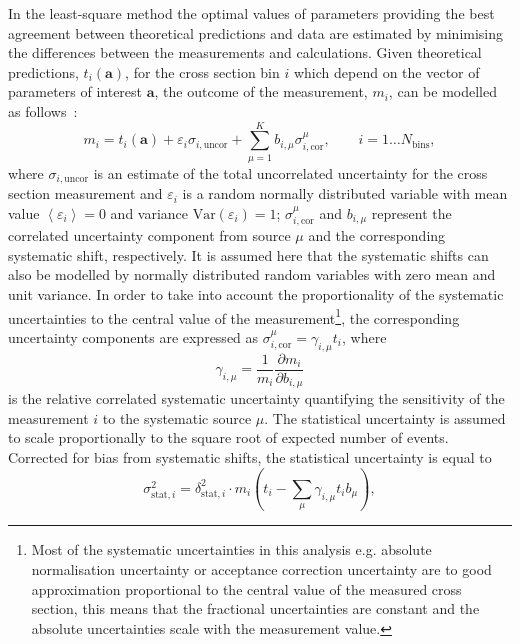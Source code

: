 In the least-square method the optimal values of parameters providing the best agreement between theoretical predictions and data are estimated by minimising the differences between the measurements and calculations. Given theoretical predictions, $t_i\left( \mathbf{a} \right)$, for the cross section bin $i$ which depend on the vector of parameters of interest $\mathbf{a}$, the outcome of the measurement, $m_i$, can be modelled as follows~\cite{Stump:2001gu,Botje:2001fx}:
\begin{equation}
 m_i = t_i\left( \mathbf{a} \right) + \varepsilon_{i} \sigma_{i,\text{uncor}} + \sum_{\mu=1}^{K}{b_{i,\mu}\sigma_{i,\text{cor}}^\mu}, \qquad i=1\ldots N_\text{bins},
\end{equation}
where $\sigma_{i,\text{uncor}}$ is an estimate of the total uncorrelated uncertainty for the cross section measurement and $\varepsilon_{i}$ is a random normally distributed variable with mean value $\left\langle \varepsilon_{i}\right\rangle = 0$ and variance $\text{Var}\left( \varepsilon_{i}\right) = 1$; $\sigma_{i,\text{cor}}^\mu$ and $b_{i,\mu}$ represent the correlated uncertainty component from source $\mu$ and the corresponding systematic shift, respectively. It is assumed here that the systematic shifts can also be modelled by normally distributed random variables with zero mean and unit variance. In order to take into account the proportionality of the systematic uncertainties to the central value of the measurement\footnote{Most of the systematic uncertainties in this analysis e.g. absolute normalisation uncertainty or acceptance correction uncertainty are to good approximation proportional to the central value of the measured cross section, this means that the fractional uncertainties are constant and the absolute uncertainties scale with the measurement value.}, the corresponding uncertainty components are expressed as $\sigma_{i,\text{cor}}^\mu = \gamma_{i,\mu}t_i$, where 
\begin{equation}
\gamma_{i,\mu}=\frac{1}{{m_i}} \frac{\partial m_i}{\partial b_{i,\mu}}
\end{equation}
is the relative correlated systematic uncertainty quantifying the sensitivity of the measurement $i$ to the systematic source $\mu$. The statistical uncertainty is assumed to scale proportionally to the square root of expected number of events. Corrected for bias from systematic shifts, the statistical uncertainty is equal to
\begin{equation}
 \sigma_{\text{stat},i}^2 = \delta_{\text{stat},i}^2\cdot m_i\left( t_i - \sum_\mu\gamma_{i,\mu}t_ib_\mu \right),
\end{equation}
